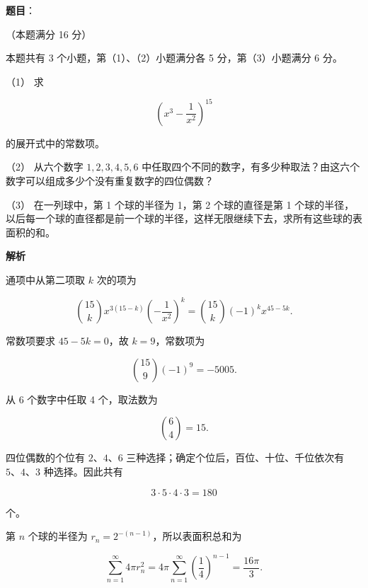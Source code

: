 \begin{answer}

\textbf{题目}：

（本题满分 16 分）

本题共有 3 个小题，第（1）、（2）小题满分各 5 分，第（3）小题满分 6 分。

（1） 求

\nopagebreak[4]
\[
\left(x^3-\frac1{x^2}\right)^{15}
\]

的展开式中的常数项。

（2） 从六个数字 $1,2,3,4,5,6$ 中任取四个不同的数字，有多少种取法？由这六个数字可以组成多少个没有重复数字的四位偶数？

（3） 在一列球中，第 1 个球的半径为 1，第 2 个球的直径是第 1 个球的半径，以后每一个球的直径都是前一个球的半径，这样无限继续下去，求所有这些球的表面积的和。

\textbf{解析}


通项中从第二项取 $k$ 次的项为

\nopagebreak[4]
\[
\binom{15}{k}x^{3(15-k)}\left(-\frac1{x^2}\right)^k
=\binom{15}{k}(-1)^k x^{45-5k}.
\]

常数项要求 $45-5k=0$，故 $k=9$，常数项为

\nopagebreak[4]
\[
\binom{15}{9}(-1)^9=-5005.
\]


从 6 个数字中任取 4 个，取法数为

\nopagebreak[4]
\[
\binom64=15.
\]

四位偶数的个位有 $2\text{、}4\text{、}6$ 三种选择；确定个位后，百位、十位、千位依次有 $5\text{、}4\text{、}3$ 种选择。因此共有

\nopagebreak[4]
\[
3\cdot5\cdot4\cdot3=180
\]

个。


第 $n$ 个球的半径为 $r_n=2^{-(n-1)}$，所以表面积总和为

\nopagebreak[4]
\[
\sum_{n=1}^{\infty}4\pi r_n^2
=4\pi\sum_{n=1}^{\infty}\left(\frac14\right)^{n-1}
=\frac{16\pi}{3}.
\]




\end{answer}
